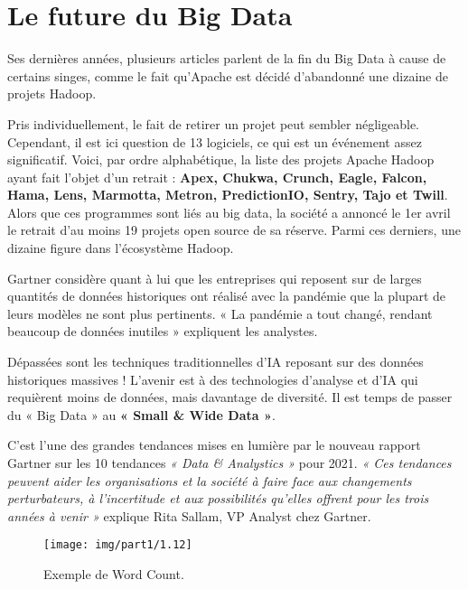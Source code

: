 \section{Le future du Big Data}
Ses dernières années, plusieurs articles parlent de la fin du Big Data à cause de certains singes, comme le fait qu’Apache est décidé d’abandonné une dizaine de projets Hadoop.

Pris individuellement, le fait de retirer un projet peut sembler négligeable. Cependant, il est ici question de 13 logiciels, ce qui est un événement assez significatif. Voici, par ordre alphabétique, la liste des projets Apache Hadoop ayant fait l’objet d’un retrait : \textbf{Apex, Chukwa, Crunch, Eagle, Falcon, Hama, Lens, Marmotta, Metron, PredictionIO, Sentry, Tajo et Twill}. Alors que ces programmes sont liés au big data, la société a annoncé le 1er avril le retrait d’au moins 19 projets open source de sa réserve. Parmi ces derniers, une dizaine figure dans l’écosystème Hadoop.

Gartner considère quant à lui que les entreprises qui reposent sur de larges quantités de données historiques ont réalisé avec la pandémie que la plupart de leurs modèles ne sont plus pertinents. « La pandémie a tout changé, rendant beaucoup de données inutiles » expliquent les analystes.

Dépassées sont les techniques traditionnelles d’IA reposant sur des données historiques massives ! L’avenir est à des technologies d’analyse et d’IA qui requièrent moins de données, mais davantage de diversité. Il est temps de passer du « Big Data » au \textbf{« Small \& Wide Data »}.

C’est l’une des grandes tendances mises en lumière par le nouveau rapport Gartner sur les 10 tendances \textit{ « Data \& Analystics »} pour 2021. \textit{ « Ces tendances peuvent aider les organisations et la société à faire face aux changements perturbateurs, à l’incertitude et aux possibilités qu’elles offrent pour les trois années à venir »} explique Rita Sallam, VP Analyst chez Gartner.

\begin{figure}[h]
	\centering
	\texttt{[image: img/part1/1.12]}
	\caption{Exemple de Word Count.}
\end{figure}